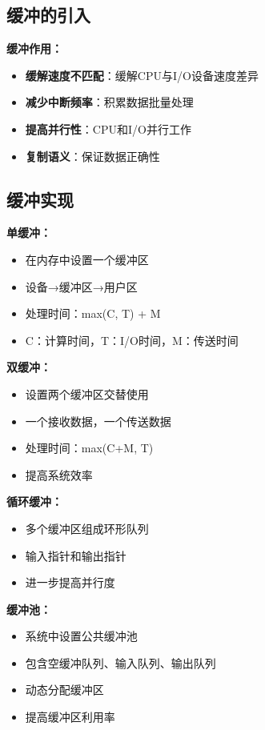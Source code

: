 \documentclass[lang=cn,newtx,10pt,scheme=chinese]{../../elegantbook}
\begin{document}
\subsection{缓冲的引入}

\textbf{缓冲作用：}
\begin{itemize}
  \item \textbf{缓解速度不匹配}：缓解CPU与I/O设备速度差异
  \item \textbf{减少中断频率}：积累数据批量处理
  \item \textbf{提高并行性}：CPU和I/O并行工作
  \item \textbf{复制语义}：保证数据正确性
\end{itemize}

\subsection{缓冲实现}

\textbf{单缓冲：}
\begin{itemize}
  \item 在内存中设置一个缓冲区
  \item 设备→缓冲区→用户区
  \item 处理时间：max(C, T) + M
  \item C：计算时间，T：I/O时间，M：传送时间
\end{itemize}

\textbf{双缓冲：}
\begin{itemize}
  \item 设置两个缓冲区交替使用
  \item 一个接收数据，一个传送数据
  \item 处理时间：max(C+M, T)
  \item 提高系统效率
\end{itemize}

\textbf{循环缓冲：}
\begin{itemize}
  \item 多个缓冲区组成环形队列
  \item 输入指针和输出指针
  \item 进一步提高并行度
\end{itemize}

\textbf{缓冲池：}
\begin{itemize}
  \item 系统中设置公共缓冲池
  \item 包含空缓冲队列、输入队列、输出队列
  \item 动态分配缓冲区
  \item 提高缓冲区利用率
\end{itemize}
\end{document}
